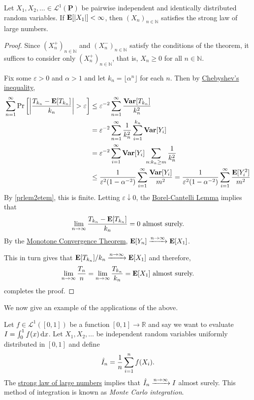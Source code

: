 \begin{ftheo}
\label{etemadi sLLN}
    Let $X_1,X_2,\ldots\in\mathcal{L}^1(\textbf{P})$ be pairwise independent and identically distributed random variables. If $\textbf{E}[|X_1|]<\infty$, then $(X_n)_{n\in\mathbb{N}}$ satisfies the strong law of large numbers.
\end{ftheo}
\begin{proof}
    Since $(X_n^+)_{n\in\mathbb{N}}$ and $(X_n^-)_{n\in\mathbb{N}}$ satisfy the conditions of the theorem, it suffices to consider only $(X_n^+)_{n\in\mathbb{N}}$, that is, $X_n\geq 0$ for all $n\in\mathbb{N}$.
    
    Fix some $\varepsilon>0$ and $\alpha>1$ and let $k_n=\lfloor\alpha^n\rfloor$ for each $n$. Then by \hyperref[chebyshev inequality]{Chebyshev's inequality},
    \begin{align*}
        \sum_{n=1}^\infty \Pr\left[\left|\frac{T_{k_n}-\expec[T_{k_n}]}{k_n}\right|>\varepsilon\right] &\leq \varepsilon^{-2} \sum_{n=1}^\infty \frac{\Var[T_{k_n}]}{k_n^2} \\
        &= \varepsilon^{-2} \sum_{n=1}^\infty \frac{1}{k_n^2}\sum_{i=1}^{k_n} \Var[Y_i] \\
        &= \varepsilon^{-2} \sum_{i=1}^\infty \Var[Y_i] \sum_{n:k_n\geq m} \frac{1}{k_n^2} \\
        &\leq \frac{1}{\varepsilon^2(1-\alpha^{-2})} \sum_{i=1}^\infty \frac{\Var[Y_i]}{m^2} = \frac{1}{\varepsilon^2(1-\alpha^{-2})} \sum_{i=1}^\infty \frac{\expec[Y_i^2]}{m^2}
    \end{align*}
    By \cref{prlem2etem}, this is finite. Letting $\varepsilon\downarrow 0$, the \hyperref[borelCantelliLemma]{Borel-Cantelli Lemma} implies that
    $$\lim_{n\to\infty} \frac{T_{k_n} - \textbf{E}[T_{k_n}]}{k_n}=0\text{ almost surely.}$$
    By the \hyperref[Monotone Convergence Theorem]{Monotone Convergence Theorem}, $\textbf{E}[Y_n]\xrightarrow{n\to\infty}\textbf{E}[X_1]$.
    
    This in turn gives that $\textbf{E}[T_{k_n}]/k_n\xrightarrow{n\to\infty}\textbf{E}[X_1]$ and therefore, 
    $$\lim_{n\to\infty}\frac{T_{n}}{n}=\lim_{n\to\infty}\frac{T_{k_n}}{k_n}=\textbf{E}[X_1]\text{ almost surely.}$$
     completes the proof.
\end{proof}

\vspace{2mm}
We now give an example of the applications of the above.

Let $f\in\mathcal{L}^1([0,1])$ be a function  $[0,1]\to\mathbb{R}$ and say we want to evaluate $I=\int_0^1 f(x)\operatorname{d}\!{x}$. Let $X_1,X_2,\ldots$ be independent random variables uniformly distributed in $[0,1]$ and define
$$\Hat{I}_n = \frac{1}{n}\sum_{i=1}^n f(X_i).$$
The \hyperref[etemadi sLLN]{strong law of large numbers} implies that $\Hat{I}_n\xrightarrow{n\to\infty} I$ almost surely. This method of integration is known as \textit{Monte Carlo integration}.

